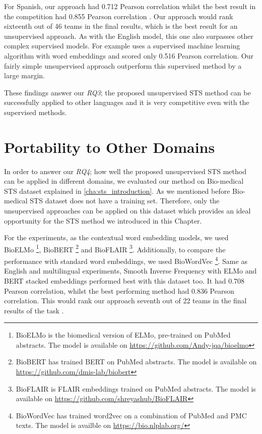 For Spanish, our approach had 0.712 Pearson correlation whilst the best result \cite{tian-etal-2017-ecnu} in the competition had 0.855 Pearson correlation \cite{cer-etal-2017-semeval}. Our approach would rank sixteenth out of 46 teams in the final results, which is the best result for an unsupervised approach. As with the English model, this one also surpasses other complex supervised models. For example \citet{barrow-peskov-2017-umdeep} uses a supervised machine learning algorithm with word embeddings and scored only 0.516 Pearson correlation. Our fairly simple unsupervised approach outperform this supervised method by a large margin. 

These findings answer our \textit{RQ3}; the proposed unsupervised STS method can be successfully applied to other languages and it is very competitive even with the supervised methods. 


\section{Portability to Other Domains}
\label{sec:state_domains}
In order to answer our \textit{RQ4}; how well the proposed unsupervised STS method can be applied in different domains, we evaluated our method on Bio-medical STS dataset explained in \ref{cha:sts_introduction}. As we mentioned before Bio-medical STS dataset does not have a training set. Therefore, only the unsupervised approaches can be applied on this dataset which provides an ideal opportunity for the STS method we introduced in this Chapter. 

For the experiments, as the contextual word embedding models, we used BioELMo \cite{jin2019probing}\footnote{BioELMo is the biomedical version of ELMo, pre-trained on PubMed abstracts. The model is available on \url{https://github.com/Andy-jqa/bioelmo}}, BioBERT \cite{10.1093/bioinformatics/btz682}\footnote{BioBERT has trained BERT on PubMed abstracts. The model is available on \url{https://github.com/dmis-lab/biobert}} and BioFLAIR \cite{sharma2019bioflair}\footnote{BioFLAIR is FLAIR embeddings trained on PubMed abstracts. The model is available on \url{https://github.com/shreyashub/BioFLAIR}}. Additionally, to compare the performance with standard word embeddings, we used BioWordVec \cite{Zhang2019}\footnote{BioWordVec has trained word2vec on a combination of PubMed and PMC texts. The model is availble on \url{https://bio.nlplab.org/}}. Same as English and multilingual experiments, Smooth Inverse Frequency with ELMo and BERT stacked embeddings performed best with this dataset too. It had 0.708 Pearson correlation, whilst the best performing method had 0.836 Pearson correlation. This would rank our approach seventh out of 22 teams in the final results of the task \cite{10.1093/bioinformatics/btx238}.


